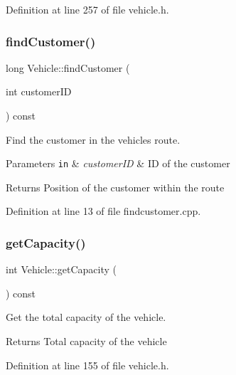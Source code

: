 Definition at line 257 of file vehicle.\+h.

\mbox{\label{class_vehicle_a6e8bb4ad5126e5b7ed6894a11400449e}} 
\subsubsection{\texorpdfstring{find\+Customer()}{findCustomer()}}
{\footnotesize\ttfamily long Vehicle\+::find\+Customer (\begin{DoxyParamCaption}\item[{int}]{customer\+ID }\end{DoxyParamCaption}) const}

Find the customer in the vehicle\textquotesingle{}s route. 
\begin{DoxyParams}[1]{Parameters}
\mbox{\tt in}  & {\em customer\+ID} & ID of the customer \\
\hline
\end{DoxyParams}
\begin{DoxyReturn}{Returns}
Position of the customer within the route 
\end{DoxyReturn}


Definition at line 13 of file findcustomer.\+cpp.

\mbox{\label{class_vehicle_ac1c0f2280c871eabc659e83e4d18252f}} 
\subsubsection{\texorpdfstring{get\+Capacity()}{getCapacity()}}
{\footnotesize\ttfamily int Vehicle\+::get\+Capacity (\begin{DoxyParamCaption}{ }\end{DoxyParamCaption}) const\hspace{0.3cm}{\ttfamily [inline]}}

Get the total capacity of the vehicle. \begin{DoxyReturn}{Returns}
Total capacity of the vehicle 
\end{DoxyReturn}


Definition at line 155 of file vehicle.\+h.

\mbox{\label{class_vehicle_a095c19748573c646c3eaf12581e4d969}} 
